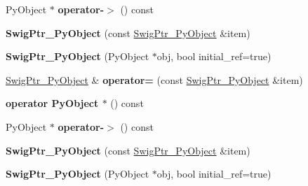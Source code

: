 \begin{DoxyCompactItemize}
\item 
\hypertarget{classswig_1_1SwigPtr__PyObject_a97a20cad6a2b0916f39c45555fb559f0}{
PyObject $\ast$ {\bfseries operator-\/$>$} () const }
\label{d2/d50/classswig_1_1SwigPtr__PyObject_a97a20cad6a2b0916f39c45555fb559f0}

\item 
\hypertarget{classswig_1_1SwigPtr__PyObject_a4282f20207f8cd22c9b079203c832a04}{
{\bfseries SwigPtr\_\-PyObject} (const \hyperlink{classswig_1_1SwigPtr__PyObject}{SwigPtr\_\-PyObject} \&item)}
\label{d2/d50/classswig_1_1SwigPtr__PyObject_a4282f20207f8cd22c9b079203c832a04}

\item 
\hypertarget{classswig_1_1SwigPtr__PyObject_a4503d58d577d209f5e1fa67026852505}{
{\bfseries SwigPtr\_\-PyObject} (PyObject $\ast$obj, bool initial\_\-ref=true)}
\label{d2/d50/classswig_1_1SwigPtr__PyObject_a4503d58d577d209f5e1fa67026852505}

\item 
\hypertarget{classswig_1_1SwigPtr__PyObject_a86d8657d6b4a27c8e9e6942bc1ba572c}{
\hyperlink{classswig_1_1SwigPtr__PyObject}{SwigPtr\_\-PyObject} \& {\bfseries operator=} (const \hyperlink{classswig_1_1SwigPtr__PyObject}{SwigPtr\_\-PyObject} \&item)}
\label{d2/d50/classswig_1_1SwigPtr__PyObject_a86d8657d6b4a27c8e9e6942bc1ba572c}

\item 
\hypertarget{classswig_1_1SwigPtr__PyObject_aa2f1cdba0651c7a52482d225faef0574}{
{\bfseries operator PyObject $\ast$} () const }
\label{d2/d50/classswig_1_1SwigPtr__PyObject_aa2f1cdba0651c7a52482d225faef0574}

\item 
\hypertarget{classswig_1_1SwigPtr__PyObject_a97a20cad6a2b0916f39c45555fb559f0}{
PyObject $\ast$ {\bfseries operator-\/$>$} () const }
\label{d2/d50/classswig_1_1SwigPtr__PyObject_a97a20cad6a2b0916f39c45555fb559f0}

\item 
\hypertarget{classswig_1_1SwigPtr__PyObject_a4282f20207f8cd22c9b079203c832a04}{
{\bfseries SwigPtr\_\-PyObject} (const \hyperlink{classswig_1_1SwigPtr__PyObject}{SwigPtr\_\-PyObject} \&item)}
\label{d2/d50/classswig_1_1SwigPtr__PyObject_a4282f20207f8cd22c9b079203c832a04}

\item 
\hypertarget{classswig_1_1SwigPtr__PyObject_a4503d58d577d209f5e1fa67026852505}{
{\bfseries SwigPtr\_\-PyObject} (PyObject $\ast$obj, bool initial\_\-ref=true)}
\label{d2/d50/classswig_1_1SwigPtr__PyObject_a4503d58d577d209f5e1fa67026852505}


\end{DoxyCompactItemize}
